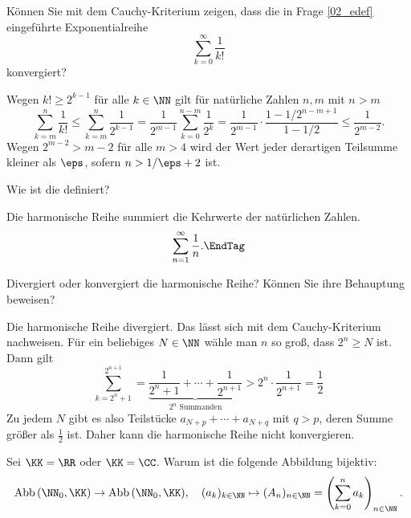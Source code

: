 \begin{frage}
  Können Sie mit dem Cauchy-Kriterium zeigen, dass die 
  in Frage \ref{02_edef} eingeführte Exponentialreihe 
  \[
  \sum_{k=0}^\infty \frac{1}{k!}
  \]
  konvergiert?
\end{frage}

\begin{antwort}
  Wegen $k!\ge 2^{k-1}$ für alle $k\in \NN$ gilt für natürliche Zahlen 
  $n,m$ mit $n>m$
  \[
  \sum_{k=m}^n \frac{1}{k!}  \le 
  \sum_{k=m}^n \frac{1}{2^{k-1}} = 
  \frac{1}{2^{m-1}} \sum_{k=0}^{n-m} \frac{1}{2^k} =
  \frac{1}{2^{m-1}} \cdot \frac{ 1-1/2^{n-m+1} }{ 1-1/2 } 
  \le \frac{1}{2^{m-2}}.
  \]
  Wegen $2^{m-2} > m-2$ für alle $m>4$ wird der Wert jeder derartigen 
  Teilsumme kleiner als $\eps$, sofern $n>1/\eps+2$ ist. 
\AntEnd
\end{antwort}

\begin{frage}
  Wie ist die  definiert?
\end{frage}

\begin{antwort}
  Die harmonische Reihe summiert die Kehrwerte der natürlichen Zahlen.
  \[
  \sum_{n=1}^\infty \frac1n. \EndTag
  \]
\end{antwort}

\begin{frage}
  Divergiert oder konvergiert die harmonische Reihe? 
  Können Sie ihre Behauptung beweisen?
\end{frage}

\begin{antwort}
  Die harmonische Reihe divergiert. 
  Das lässt sich mit dem Cauchy-Kriterium nachweisen. 
  Für ein beliebiges $N\in\NN$ wähle man $n$ so groß, 
  dass $2^n \ge N$ ist. Dann gilt 
  \[
  \sum_{k=2^n+1}^{2^{n+1}} = 
  \underbrace{\frac{1}{2^n+1}+\cdots + \frac{1}{2^{n+1}}}_
  {\text{$2^n$ Summanden}} > 2^n\cdot \frac{1}{2^{n+1}} 
  =\frac{1}{2}
  \]
  Zu jedem $N$ gibt es also Teilstücke $a_{N+p}+\cdots+a_{N+q}$ 
  mit $q>p$, deren Summe größer als $\frac{1}{2}$ ist. Daher kann die 
  harmonische Reihe nicht konvergieren. 
  \AntEnd
\end{antwort}

\begin{frage}\label{02_abb}
  Sei $\KK=\RR$ oder $\KK=\CC$. Warum ist die 
  folgende Abbildung bijektiv:
  \[
  \mathrm{Abb}\,(\NN_0,\KK) \to \mathrm{Abb}\,(\NN_0,\KK),\quad 
  (a_k)_{k\in\NN}  \mapsto (A_n)_{n\in\NN} = 
  \left( \sum_{k=0}^n a_k \right)_{n\in\NN}.
  \]
\end{frage}

